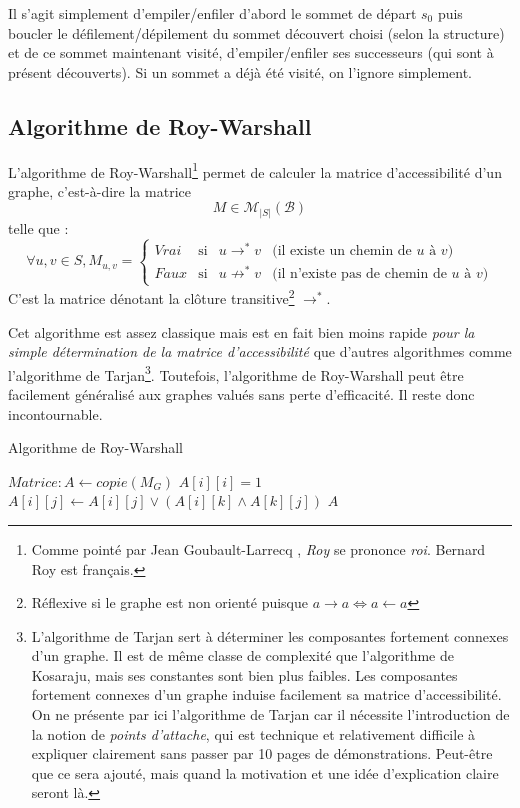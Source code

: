 \documentclass[../../../main.tex]{subfiles}
\begin{document}
Il s'agit simplement d'empiler/enfiler d'abord le sommet de départ $s_0$ puis boucler le défilement/dépilement du sommet découvert choisi (selon la structure) et de ce sommet maintenant visité, d'empiler/enfiler ses successeurs (qui sont à présent découverts). Si un sommet a déjà été visité, on l'ignore simplement.
\subsection{Algorithme de Roy-Warshall}
L'algorithme de Roy-Warshall\footnote{Comme pointé par Jean Goubault-Larrecq \cite{ENSGraphes}, \textit{Roy} se prononce \textit{roi}. Bernard Roy est français.} permet de calculer la matrice d'accessibilité d'un graphe, c'est-à-dire la matrice $$M\in\mathcal{M}_{|S|}(\mathcal{B})$$ telle que :
$$\forall u, v\in S, M_{u, v} = \left\{
\begin{array}{lcll}
\textit{Vrai} & \text{si} & u\rightarrow^* v & \text{(il existe un chemin de $u$ à $v$)} \\
\textit{Faux} & \text{si} & u\not\rightarrow^*v & \text{(il n'existe pas de chemin de $u$ à $v$)}
\end{array}\right.
$$
C'est la matrice dénotant la clôture transitive\footnote{Réflexive si le graphe est non orienté puisque $a\rightarrow a\Leftrightarrow a\leftarrow a$} $\rightarrow^*$.

Cet algorithme est assez classique mais est en fait bien moins rapide \textit{pour la simple détermination de la matrice d'accessibilité} que d'autres algorithmes comme l'algorithme de Tarjan\footnote{L'algorithme de Tarjan sert à déterminer les composantes fortement connexes d'un graphe. Il est de même classe de complexité que l'algorithme de Kosaraju, mais ses constantes sont bien plus faibles. Les composantes fortement connexes d'un graphe induise facilement sa matrice d'accessibilité. On ne présente par ici l'algorithme de Tarjan car il nécessite l'introduction de la notion de \textit{points d'attache}, qui est technique et relativement difficile à expliquer clairement sans passer par 10 pages de démonstrations. Peut-être que ce sera ajouté, mais quand la motivation et une idée d'explication claire seront là.}. Toutefois, l'algorithme de Roy-Warshall peut être facilement généralisé aux graphes valués sans perte d'efficacité. Il reste donc incontournable.

\begin{algorithm}
\caption{Algorithme de Roy-Warshall}\label{alg:roy_warshall}
$Matrice:A\leftarrow copie(M_G)$\;
 {
	$A[i][i] = 1$
}
 {
	 {
		 {
			$A[i][j]\leftarrow A[i][j]\vee (A[i][k] \wedge A[k][j])$\;
		}
	}
}
\Return $A$\;
\end{algorithm}
\end{document}
